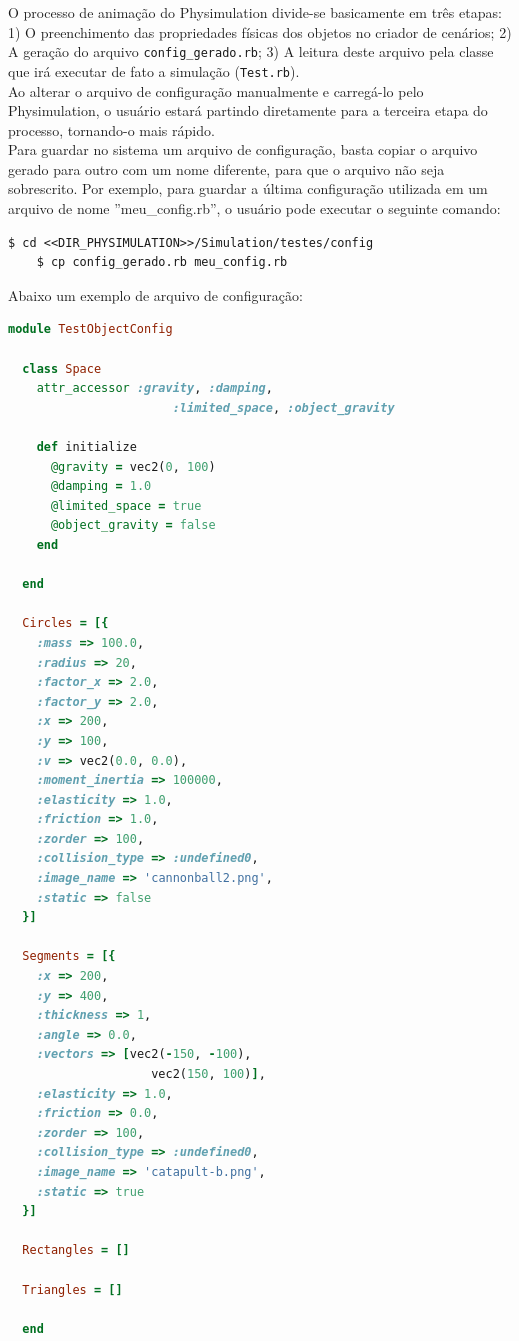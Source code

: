 O processo de animação do Physimulation divide-se basicamente em três etapas: 1) O preenchimento das propriedades físicas dos objetos no criador de cenários; 2) A geração do arquivo {\tt config\_gerado.rb}; 3) A leitura deste arquivo pela classe que irá executar de fato a simulação ({\tt Test.rb}). \\

Ao alterar o arquivo de configuração manualmente e carregá-lo pelo Physimulation, o usuário estará partindo diretamente para a terceira etapa do processo, tornando-o mais rápido. \\

Para guardar no sistema um arquivo de configuração, basta copiar o arquivo gerado para outro com um nome diferente, para que o arquivo não seja sobrescrito. Por exemplo, para guardar a última configuração utilizada em um arquivo de nome ''meu\_config.rb'', o usuário pode executar o seguinte comando:

\begin{Verbatim}[fontsize=\footnotesize]
	$ cd <<DIR_PHYSIMULATION>>/Simulation/testes/config
	$ cp config_gerado.rb meu_config.rb
\end{Verbatim}

Abaixo um exemplo de arquivo de configuração:


\begin{lstlisting}[language=Ruby, caption=Exemplo de arquivo config.rb]
module TestObjectConfig

  class Space
    attr_accessor :gravity, :damping, 
                       :limited_space, :object_gravity

    def initialize
      @gravity = vec2(0, 100)
      @damping = 1.0
      @limited_space = true
      @object_gravity = false
    end

  end

  Circles = [{
    :mass => 100.0,
    :radius => 20,
    :factor_x => 2.0, 
    :factor_y => 2.0,
    :x => 200,
    :y => 100,
    :v => vec2(0.0, 0.0),
    :moment_inertia => 100000,
    :elasticity => 1.0,
    :friction => 1.0,
    :zorder => 100,
    :collision_type => :undefined0,
    :image_name => 'cannonball2.png',
    :static => false
  }]

  Segments = [{
    :x => 200,
    :y => 400,
    :thickness => 1,
    :angle => 0.0,
    :vectors => [vec2(-150, -100), 
                    vec2(150, 100)],
    :elasticity => 1.0,
    :friction => 0.0,
    :zorder => 100,
    :collision_type => :undefined0,
    :image_name => 'catapult-b.png',
    :static => true
  }]

  Rectangles = []

  Triangles = []

  end
\end{lstlisting}

